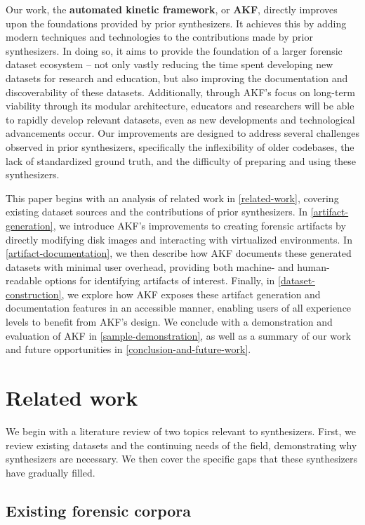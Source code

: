 \documentclass[preprint,12pt]{elsarticle}
\begin{document}
Our work, the \textbf{automated kinetic framework}, or \textbf{AKF},
directly improves upon the foundations provided by prior synthesizers.
It achieves this by adding modern techniques and technologies to the
contributions made by prior synthesizers. In doing so, it aims to
provide the foundation of a larger forensic dataset ecosystem -- not
only vastly reducing the time spent developing new datasets for research
and education, but also improving the documentation and discoverability
of these datasets. Additionally, through AKF's focus on long-term
viability through its modular architecture, educators and researchers
will be able to rapidly develop relevant datasets, even as new
developments and technological advancements occur. Our improvements are
designed to address several challenges observed in prior synthesizers,
specifically the inflexibility of older codebases, the lack of
standardized ground truth, and the difficulty of preparing and using
these synthesizers.

This paper begins with an analysis of related work in \autoref{related-work}, covering existing dataset sources and the contributions of prior
synthesizers. In \autoref{artifact-generation}, we introduce AKF's
improvements to creating forensic artifacts by directly modifying disk
images and interacting with virtualized environments. In
\autoref{artifact-documentation}, we then describe how AKF documents
these generated datasets with minimal user overhead, providing both
machine- and human-readable options for identifying artifacts of
interest. Finally, in \autoref{dataset-construction}, we explore how
AKF exposes these artifact generation and documentation features in an
accessible manner, enabling users of all experience levels to benefit
from AKF's design. We conclude with a demonstration and evaluation of
AKF in \autoref{sample-demonstration}, as well as a summary of our work
and future opportunities in \autoref{conclusion-and-future-work}.

\section{Related work}\label{related-work}

We begin with a literature review of two topics relevant to
synthesizers. First, we review existing datasets and the continuing
needs of the field, demonstrating why synthesizers are necessary. We
then cover the specific gaps that these synthesizers have gradually
filled.

\subsection{Existing forensic corpora}\label{existing-forensic-corpora}
\end{document}

